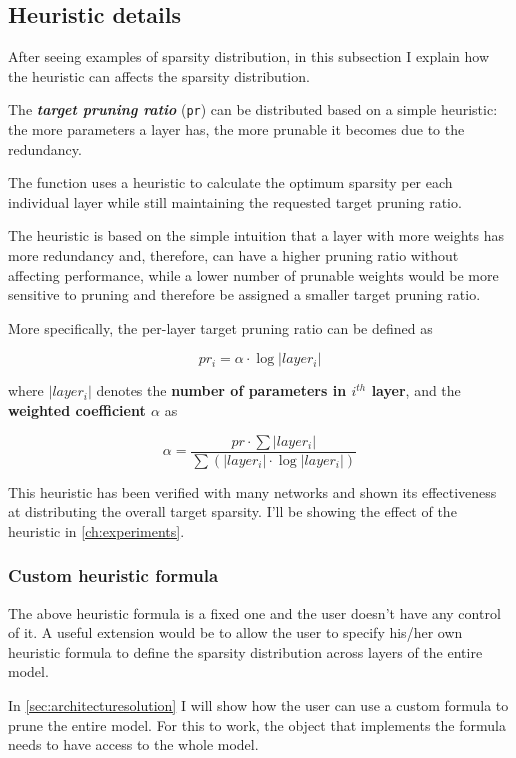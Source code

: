 \subsection{Heuristic details}
After seeing examples of sparsity distribution, in this subsection I explain
how the heuristic can affects the sparsity distribution.

The \textbf{\textit{target pruning ratio}} (\texttt{pr}) can be distributed
based on a simple heuristic: the more parameters a layer has, the more prunable
it becomes due to the redundancy.

The function uses a heuristic to calculate the optimum sparsity per each
individual layer while still maintaining the requested target pruning ratio.

The heuristic is based on the simple intuition that a layer with more weights
has more redundancy and, therefore, can have a higher pruning ratio without
affecting performance, while a lower number of prunable weights would be more
sensitive to pruning and therefore be assigned a smaller target pruning ratio.

More specifically, the per-layer target pruning ratio can be defined as

\begin{equation}
    pr_i = \alpha \cdot \log|layer_i|
\end{equation}

where $|layer_i|$ denotes the \textbf{number of parameters in $i^{th}$ layer},
and the \textbf{weighted coefficient $\alpha$} as

\begin{equation}
    \alpha = \frac{pr \cdot \sum|layer_i|}{\sum(|layer_i| \cdot \log|layer_i|)}
\end{equation}

This heuristic has been verified with many networks and shown its effectiveness
at distributing the overall target sparsity\cite{wu2018pocketflow}. I'll be
showing the effect of the heuristic in \autoref{ch:experiments}.

\subsubsection{Custom heuristic formula}
The above heuristic formula is a fixed one and the user doesn't have any
control of it. A useful extension would be to allow the user to specify his/her
own heuristic formula to define the sparsity distribution across layers of the
entire model.

In \autoref{sec:architecturesolution} I will show how the user can use a custom
formula to prune the entire model. For this to work, the object that implements
the formula needs to have access to the whole model.

